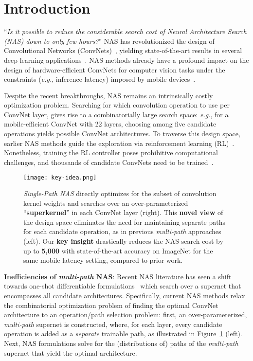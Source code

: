 \documentclass[runningheads]{llncs}
\begin{document}
\section{Introduction}

``\textit{Is it possible to reduce the considerable search cost of Neural 
Architecture Search (NAS) down to only \textit{few hours}?}''
NAS has revolutionized the design of Convolutional Networks
(ConvNets)~\cite{zoph2017learning},
yielding state-of-the-art results in several deep learning applications~\cite{real2018regularized}.
NAS methods already have a profound impact on the design of hardware-efficient 
ConvNets for computer vision tasks under the constraints (\textit{e.g.}, 
inference latency) imposed by mobile devices~\cite{tan2018mnasnet}.


Despite the recent breakthroughs, NAS remains an intrinsically costly 
optimization problem. Searching for 
which convolution operation to use per ConvNet layer, gives rise to a 
combinatorially large search space: \textit{e.g.}, for a mobile-efficient 
ConvNet with 22 layers, choosing among five candidate operations
yields  possible ConvNet architectures. 
To traverse this design space, earlier NAS methods guide the exploration
via reinforcement learning (RL)~\cite{tan2018mnasnet}. Nonetheless, 
training the RL controller poses prohibitive computational challenges, 
and thousands of candidate ConvNets need to be trained~\cite{wu2018fbnet}. 


\begin{figure}[ht!]
  \centering
  \texttt{[image: key-idea.png]}
  \caption{\textit{Single-Path NAS} directly 
  optimizes for the subset of convolution kernel weights and searches
  over an over-parameterized ``\textbf{superkernel}'' in each ConvNet layer
  (right). This \textbf{novel view} of the design space
  eliminates the need for maintaining separate paths for each candidate 
  operation, as in previous \textit{multi-path} approaches (left). 
  Our \textbf{key insight} drastically reduces the NAS search cost by up to 
  \textbf{5,000} with state-of-the-art accuracy 
  on ImageNet for the same mobile latency setting, compared to prior work.}
  \label{fig:key_idea}
\end{figure}


\textbf{Inefficiencies of \textit{multi-path} NAS}:
Recent NAS literature has seen a shift towards one-shot differentiable
formulations~\cite{liu2018darts,pham2018efficient,xie2018snas}
which search over a supernet that encompasses all candidate 
architectures. Specifically, current NAS methods relax 
the combinatorial optimization problem of finding the optimal ConvNet 
architecture to an operation/path selection problem: first, 
an over-parameterized, \textit{multi-path} supernet is constructed, 
where, for each layer, every candidate operation is added as a 
\textit{separate} trainable path, as illustrated in Figure~\ref{fig:key_idea} (left).
Next, NAS formulations solve for the (distributions of) paths of the 
\textit{multi-path} supernet that yield the optimal architecture.
\end{document}
